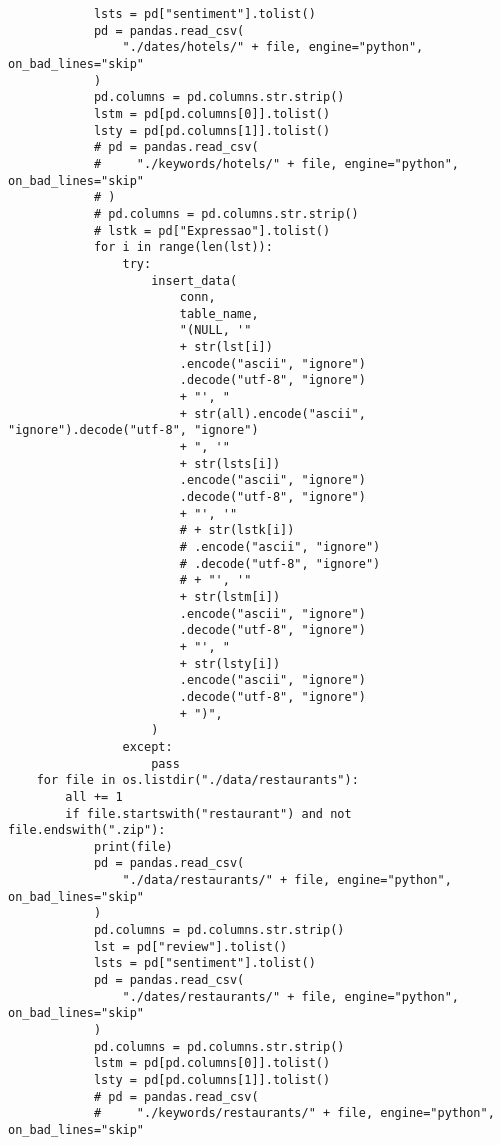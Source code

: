 \begin{verbatim}
            lsts = pd["sentiment"].tolist()
            pd = pandas.read_csv(
                "./dates/hotels/" + file, engine="python", on_bad_lines="skip"
            )
            pd.columns = pd.columns.str.strip()
            lstm = pd[pd.columns[0]].tolist()
            lsty = pd[pd.columns[1]].tolist()
            # pd = pandas.read_csv(
            #     "./keywords/hotels/" + file, engine="python", on_bad_lines="skip"
            # )
            # pd.columns = pd.columns.str.strip()
            # lstk = pd["Expressao"].tolist()
            for i in range(len(lst)):
                try:
                    insert_data(
                        conn,
                        table_name,
                        "(NULL, '"
                        + str(lst[i])
                        .encode("ascii", "ignore")
                        .decode("utf-8", "ignore")
                        + "', "
                        + str(all).encode("ascii", "ignore").decode("utf-8", "ignore")
                        + ", '"
                        + str(lsts[i])
                        .encode("ascii", "ignore")
                        .decode("utf-8", "ignore")
                        + "', '"
                        # + str(lstk[i])
                        # .encode("ascii", "ignore")
                        # .decode("utf-8", "ignore")
                        # + "', '"
                        + str(lstm[i])
                        .encode("ascii", "ignore")
                        .decode("utf-8", "ignore")
                        + "', "
                        + str(lsty[i])
                        .encode("ascii", "ignore")
                        .decode("utf-8", "ignore")
                        + ")",
                    )
                except:
                    pass
    for file in os.listdir("./data/restaurants"):
        all += 1
        if file.startswith("restaurant") and not file.endswith(".zip"):
            print(file)
            pd = pandas.read_csv(
                "./data/restaurants/" + file, engine="python", on_bad_lines="skip"
            )
            pd.columns = pd.columns.str.strip()
            lst = pd["review"].tolist()
            lsts = pd["sentiment"].tolist()
            pd = pandas.read_csv(
                "./dates/restaurants/" + file, engine="python", on_bad_lines="skip"
            )
            pd.columns = pd.columns.str.strip()
            lstm = pd[pd.columns[0]].tolist()
            lsty = pd[pd.columns[1]].tolist()
            # pd = pandas.read_csv(
            #     "./keywords/restaurants/" + file, engine="python", on_bad_lines="skip"

\end{verbatim}
